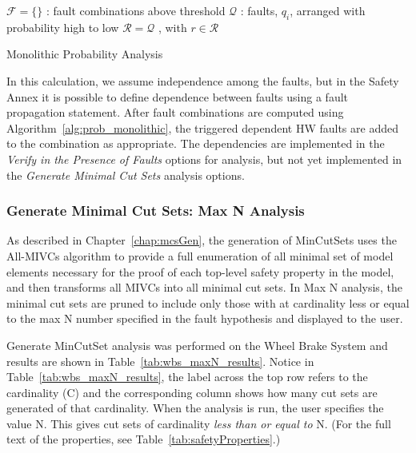 \begin{algorithm}[H]
	$\mathcal{F} = \{\}$ : fault combinations above threshold \;
	$\mathcal{Q}$ : faults, $q_i$, arranged with probability high to low \;
	$\mathcal{R} = \mathcal{Q}$ , with $r \in \mathcal{R}$\;
	\caption{Monolithic Probability Analysis}
	\label{alg:prob_monolithic}
\end{algorithm}
In this calculation, we assume independence among the faults, but in the Safety Annex it is possible to define dependence between faults using a fault propagation statement. After fault combinations are computed using Algorithm~\ref{alg:prob_monolithic}, the triggered dependent HW faults are added to the combination as appropriate. The dependencies are implemented in the \textit{Verify in the Presence of Faults} options for analysis, but not yet implemented in the \textit{Generate Minimal Cut Sets} analysis options.

\subsubsection{Generate Minimal Cut Sets: Max N Analysis}
\label{sec:maxN_generate}
As described in Chapter~\ref{chap:mcsGen}, the generation of MinCutSets uses the All-MIVCs algorithm to provide a full enumeration of all minimal set of model elements necessary for the proof of each top-level safety property in the model, and then transforms all MIVCs into all minimal cut sets. In Max N analysis, the minimal cut sets are pruned to include only those with at cardinality less or equal to the max N number specified in the fault hypothesis and displayed to the user.

Generate MinCutSet analysis was performed on the Wheel Brake System and results are shown in Table~\ref{tab:wbs_maxN_results}. Notice in Table~\ref{tab:wbs_maxN_results}, the label across the top row refers to the cardinality (C) and the corresponding column shows how many cut sets are generated of that cardinality. When the analysis is run, the user specifies the value N. This gives cut sets of cardinality \textit{less than or equal to} N. (For the full text of the properties, see Table~\ref{tab:safetyProperties}.)

